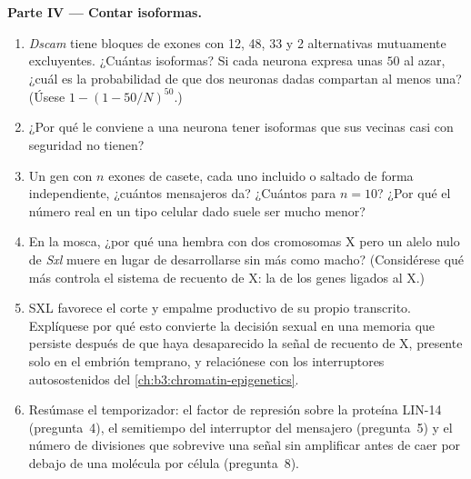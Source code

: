 \begin{problem}
\medskip
\noindent\textbf{Parte IV --- Contar isoformas.}
\begin{enumerate}[resume]
  \item \emph{Dscam} tiene bloques de exones con 12, 48, 33 y 2
        alternativas mutuamente excluyentes. ¿Cuántas isoformas? Si cada
        neurona expresa unas $50$ al azar, ¿cuál es la probabilidad de
        que dos neuronas dadas compartan al menos una? (Úsese $1 - (1 -
        50/N)^{50}$.)
  \item ¿Por qué le conviene a una neurona tener isoformas que sus
        vecinas casi con seguridad no tienen?
  \item Un gen con $n$ exones de casete, cada uno incluido o saltado de
        forma independiente, ¿cuántos mensajeros da? ¿Cuántos para
        $n = 10$? ¿Por qué el número real en un tipo celular dado suele
        ser mucho menor?
  \item En la mosca, ¿por qué una hembra con dos cromosomas X pero un
        alelo nulo de \emph{Sxl} muere en lugar de desarrollarse sin más
        como macho? (Considérese qué más controla el sistema de recuento
        de X: la  de los genes ligados al X.)
  \item SXL favorece el corte y empalme productivo de su propio
        transcrito. Explíquese por qué esto convierte la decisión sexual
        en una memoria que persiste después de que haya desaparecido la
        señal de recuento de X, presente solo en el embrión temprano, y
        relaciónese con los interruptores autosostenidos del
        \cref{ch:b3:chromatin-epigenetics}.
  \item Resúmase el temporizador: el factor de represión sobre la
        proteína LIN-14 (pregunta~4), el semitiempo del interruptor del
        mensajero (pregunta~5) y el número de divisiones que sobrevive
        una señal sin amplificar antes de caer por debajo de una
        molécula por célula (pregunta~8).
\end{enumerate}
\end{problem}
